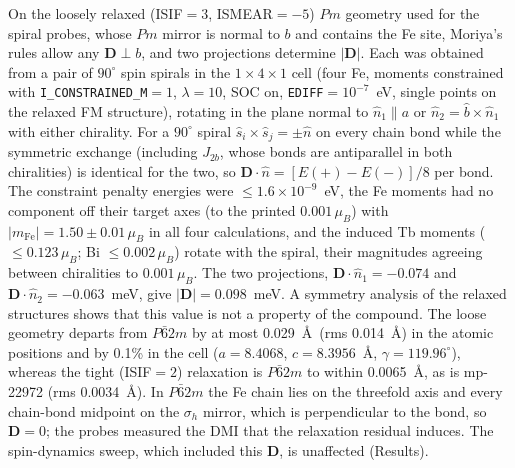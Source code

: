 \documentclass[aps,prb,preprint,superscriptaddress,longbibliography,nofootinbib]{revtex4-2}
\begin{document}
On the loosely relaxed (ISIF$=3$, ISMEAR$=-5$) $Pm$ geometry used for the spiral probes, whose $Pm$ mirror is
normal to $b$ and contains the Fe site, Moriya's rules allow any $\mathbf{D}\perp b$, and two projections
determine $|\mathbf{D}|$. Each was obtained from a pair of $90^\circ$ spin spirals in the
$1\times4\times1$ cell (four Fe, moments constrained with \texttt{I\_CONSTRAINED\_M}$=1$, $\lambda=10$, SOC on,
\texttt{EDIFF}$=10^{-7}$~eV, single points on the relaxed FM structure), rotating in the plane normal to
$\hat{n}_1\parallel a$ or $\hat{n}_2=\hat{b}\times\hat{n}_1$ with either chirality. For a $90^\circ$ spiral
$\hat{s}_i\times\hat{s}_j=\pm\hat{n}$ on every chain bond while the symmetric exchange (including $J_{2b}$,
whose bonds are antiparallel in both chiralities) is identical for the two, so
$\mathbf{D}\!\cdot\!\hat{n}=[E(+)-E(-)]/8$ per bond. The constraint penalty energies were
$\le1.6\times10^{-9}$~eV, the Fe moments had no component off their target axes (to the printed
$0.001\,\mu_B$) with $|m_\mathrm{Fe}|=1.50\pm0.01\,\mu_B$ in all four calculations, and the induced Tb moments
($\le0.123\,\mu_B$; Bi $\le0.002\,\mu_B$) rotate with the spiral, their magnitudes agreeing between
chiralities to $0.001\,\mu_B$. The two projections, $\mathbf{D}\!\cdot\!\hat{n}_1=-0.074$ and
$\mathbf{D}\!\cdot\!\hat{n}_2=-0.063$~meV, give $|\mathbf{D}|=0.098$~meV. A symmetry analysis of the
relaxed structures shows that this value is not a property of the compound. The loose geometry departs from
$P\bar{6}2m$ by at most 0.029~\AA\ (rms 0.014~\AA) in the atomic positions and by 0.1\% in the cell
($a=8.4068$, $c=8.3956$~\AA, $\gamma=119.96^\circ$), whereas the tight (ISIF$=2$) relaxation is $P\bar{6}2m$
to within 0.0065~\AA, as is mp-22972 (rms 0.0034~\AA). In $P\bar{6}2m$ the Fe chain lies on the threefold
axis and every chain-bond midpoint on the $\sigma_h$ mirror, which is perpendicular to the bond, so
$\mathbf{D}=0$; the probes measured the DMI that the relaxation residual induces. The spin-dynamics sweep,
which included this $\mathbf{D}$, is unaffected (Results).
\end{document}
